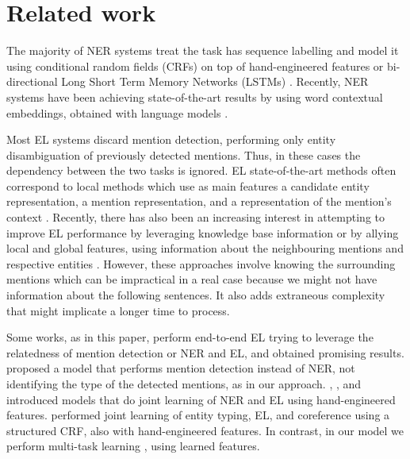 \documentclass[11pt,a4paper,dvipsnames]{article}
\begin{document}
\section{Related work}

The majority of NER systems treat the task has sequence labelling and model it using conditional random fields (CRFs) on top of hand-engineered features \cite{finkel2005incorporating} or bi-directional Long Short Term Memory Networks (LSTMs) \cite{lample2016neural, chiu2016named}. Recently, NER systems have been achieving state-of-the-art results by using word contextual embeddings, obtained with language models \cite{Peters2018, devlin2018bert, Akbik_flair}. 

Most EL systems discard mention detection, performing only entity disambiguation of previously detected mentions. Thus, in these cases the dependency between the two tasks is ignored. EL state-of-the-art methods often correspond to local methods which use as main features a candidate entity representation, a mention representation, and a representation of the mention's context \cite{sun2015modeling, yamada2016joint, YamadaSTT17, ganea2017deep}. Recently, there has also been an increasing interest in attempting to improve EL performance by leveraging knowledge base information \cite{radhakrishnan2018elden} or by allying local and global features, using information about the neighbouring mentions and respective entities \cite{le2018improving, Cao_el, yang2018collective}. However, these approaches involve knowing the surrounding mentions which can be impractical in a real case because we might not have information about the following sentences. It also adds extraneous complexity that might implicate a longer time to process.

Some works, as in this paper, perform end-to-end EL trying to leverage the relatedness of mention detection or NER and EL, and obtained promising results. \citet{Kolitsas_el} proposed a model that performs mention detection instead of NER, not identifying the type of the detected mentions, as in our approach.  \citet{sil2013re}, \citet{luo2015joint}, and \citet{nguyen2016j} introduced models that do joint learning of NER and EL using hand-engineered features. \cite{durrett2014joint} performed joint learning of entity typing, EL, and coreference using a structured CRF, also with hand-engineered features. 
In contrast, in our model we perform multi-task learning \cite{caruana1997multitask, evgeniou2004regularized}, using learned features.
\end{document}
